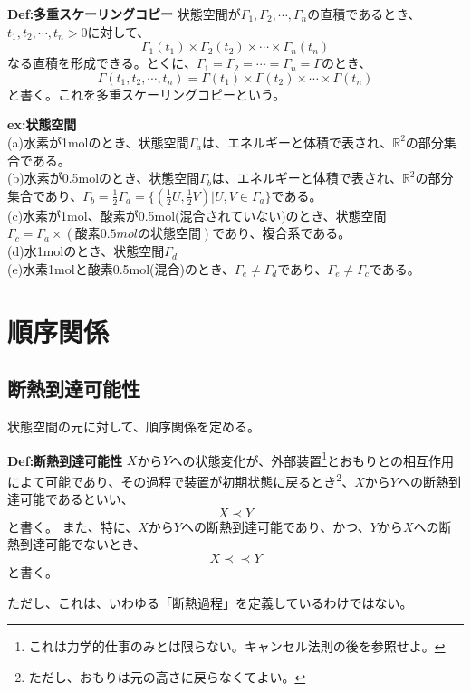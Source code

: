 \documentclass[a4paper,11pt]{jsarticle}
\numberwithin{equation}{section}
\begin{document}
\begin{itembox}[l]{\textbf{Def:多重スケーリングコピー}}
    状態空間が$\Gamma_1,\Gamma_2,\cdots,\Gamma_n$の直積であるとき、$t_1,t_2,\cdots,t_n>0$に対して、
    \begin{equation}
        \Gamma_1(t_1) \times \Gamma_2(t_2) \times \cdots \times \Gamma_n(t_n)
    \end{equation}
    なる直積を形成できる。とくに、$\Gamma_1=\Gamma_2=\cdots=\Gamma_n=\Gamma$のとき、
    \begin{equation}
        \Gamma(t_1,t_2,\cdots,t_n)=\Gamma(t_1) \times \Gamma(t_2) \times \cdots \times \Gamma(t_n)
    \end{equation}
    と書く。これを多重スケーリングコピーという。
\end{itembox}

\textbf{ex:状態空間}\\
(a)水素が1molのとき、状態空間$\Gamma_a$は、エネルギーと体積で表され、$\mathbb{{R}}^2$の部分集合である。\\
(b)水素が0.5molのとき、状態空間$\Gamma_b$は、エネルギーと体積で表され、$\mathbb{{R}}^2$の部分集合であり、$\Gamma_b=\frac{1}{2}\Gamma_a=\{(\frac{1}{2}U,\frac{1}{2}V)|U,V \in \Gamma_a\}$である。\\
(c)水素が1mol、酸素が0.5mol(混合されていない)のとき、状態空間$\Gamma_c=\Gamma_a \times (酸素0.5molの状態空間)$であり、複合系である。\\
(d)水1molのとき、状態空間$\Gamma_d$\\
(e)水素1molと酸素0.5mol(混合)のとき、$\Gamma_e\neq \Gamma_d$であり、$\Gamma_e\neq \Gamma_c$である。\\

\section{順序関係}
\subsection{断熱到達可能性}
状態空間の元に対して、順序関係を定める。
\begin{itembox}[l]{\textbf{Def:断熱到達可能性}}
    $X$から$Y$への状態変化が、外部装置\footnote{これは力学的仕事のみとは限らない。キャンセル法則の後を参照せよ。}とおもりとの相互作用によて可能であり、その過程で装置が初期状態に戻るとき\footnote{ただし、おもりは元の高さに戻らなくてよい。}、$X$から$Y$への断熱到達可能であるといい、
    \begin{equation}
        X \prec Y
    \end{equation}
    と書く。
    また、特に、$X$から$Y$への断熱到達可能であり、かつ、$Y$から$X$への断熱到達可能でないとき、
    \begin{equation}
        X \prec \prec Y
    \end{equation}
    と書く。
\end{itembox}
ただし、これは、いわゆる「断熱過程」を定義しているわけではない。\\
\end{document}
